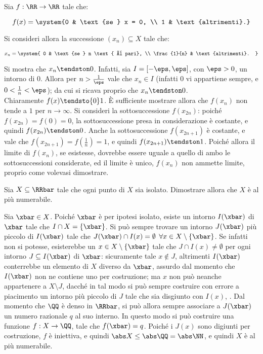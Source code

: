 \documentclass[11pt]{article}
\begin{document}
	\begin{solution}
		Sia $f : \RR \to \RR$ tale che:
		
		\[ f(x) = \system{0 & \text{se } x = 0, \\ 1 & \text{altrimenti}.}\]
		
		Si consideri allora la successione $(x_n) \subseteq X$ tale che:
		
		\[ x_n = \system{ 0 & \text{se } n \text{ è pari}, \\ \frac{1}{n} & \text{altrimenti}. } \]
		
		Si mostra che $x_n \tendston 0$. Infatti, sia $I = [-\eps, \eps]$, con $\eps > 0$, un intorno di $0$.
		Allora per $n > \frac{1}{\eps}$ vale che $x_n \in I$ (infatti $0$ vi appartiene sempre, e $0 < \frac{1}{n} < \eps$);
		da cui si ricava proprio che $x_n \tendston 0$. \\
		
		Chiaramente $f(x) \tendsto{0} 1$. È sufficiente mostrare allora che $f(x_n)$ non tende a $1$ per
		$n \to \infty$. Si consideri la sottosuccessione $f(x_{2n})$: poiché $f(x_{2n}) = f(0) = 0$, la
		sottosuccessione presa in considerazione è costante, e quindi $f(x_{2n}) \tendston 0$.
		Anche la sottosuccessione $f(x_{2n + 1})$ è costante, e vale che $f(x_{2n + 1}) = f(\frac{1}{n}) = 1$,
		e quindi $f(x_{2n+1}) \tendston 1$. Poiché allora il limite di $f(x_n)$, se esistesse, dovrebbe essere
		uguale a quello di ambo le sottosuccessioni considerate, ed il limite è unico, $f(x_n)$ non ammette
		limite, proprio come volevasi dimostrare.
	\end{solution}

	\begin{exercise}
		Sia $X \subseteq \RRbar$ tale che ogni punto di $X$ sia isolato.
		Dimostrare allora che $X$ è al più numerabile.
	\end{exercise}

	\begin{solution}
		Sia $\xbar \in X$. Poiché $\xbar$ è per ipotesi isolato, esiste
		un intorno $I(\xbar)$ di $\xbar$ tale che $I \cap X = \{\xbar\}$. Si può
		sempre trovare un intorno $J(\xbar)$ più piccolo di $I(\xbar)$ tale
		che $J(\xbar) \cap I(x) = \emptyset$ $\forall x \in X \setminus \{\xbar\}$.
		Se infatti non si potesse, esisterebbe un $x \in X \setminus \{\xbar\}$ tale che $J \cap I(x) \neq \emptyset$ per ogni
		intorno $J \subseteq I(\xbar)$ di $\xbar$: sicuramente tale $x \notin J$,
		altrimenti $I(\xbar)$ conterrebbe un elemento di $X$ diverso
		da $\xbar$, assurdo dal momento che $I(\xbar)$ non ne contiene uno
		per costruzione; ma $x$ non può neanche appartenere a $X \setminus J$,
		dacché in tal modo si può sempre costruire con errore a piacimento
		un intorno più piccolo di $J$ tale che sia disgiunto con $I(x)$,
		\Lightning. Dal momento che $\QQ$ è denso in $\RRbar$, si può allora
		sempre associare a $J(\xbar)$ un numero razionale $q$ al suo interno.
		In questo modo si può costruire una funzione $f : X \to \QQ$,
		tale che $f(\xbar) = q$. Poiché i $J(x)$ sono digiunti per costruzione,
		$f$ è iniettiva, e quindi $\abs X \leq \abs \QQ = \abs \NN$, e quindi
		$X$ è al più numerabile. %
	\end{solution}
\end{document}
